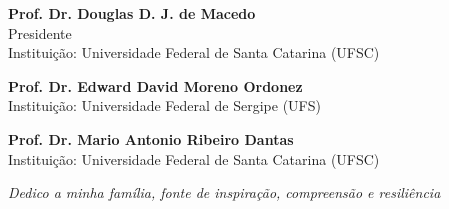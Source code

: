 \documentclass[
	12pt,				%
	oneside,			%
	a4paper,			%
	english,			%
	brazil				%
	]{abntex2ppgsi}
\begin{document}
\begin{folhadeaprovacao}
\begin{center}
%
% 
% 
%
% 
% 
% 
%
%
\textbf{Prof. Dr. Douglas D. J. de Macedo} 
\\ Presidente 
\\ Instituição: Universidade Federal de Santa Catarina (UFSC) 

\vspace*{2cm}

\textbf{Prof. Dr. Edward David Moreno Ordonez} 
\\ Instituição: Universidade Federal de Sergipe (UFS)

\vspace*{2cm}

\textbf{Prof. Dr. Mario Antonio Ribeiro Dantas} 
\\ Instituição: Universidade Federal de Santa Catarina (UFSC)

\end{center}
  
\end{folhadeaprovacao}

%
% 
\begin{dedicatoria}
   \vspace*{\fill}
  \centering
   \noindent
   \textit{Dedico a minha família, fonte de inspiração, compreensão e resiliência} 
	 \vspace*{\fill}
\end{dedicatoria}
\end{document}
